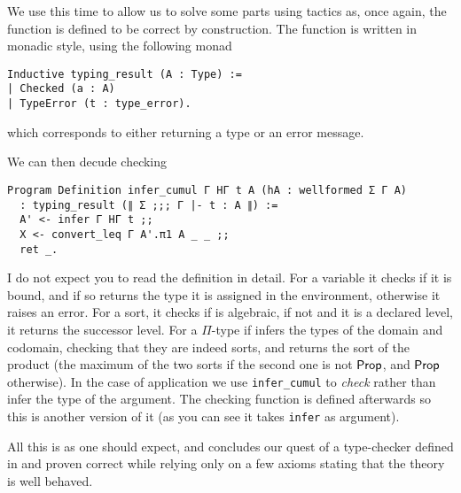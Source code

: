 We use \Program this time to allow us to solve some parts using tactics as,
once again, the function is defined to be correct by construction.
The function is written in monadic style, using the following monad
\begin{verbatim}
Inductive typing_result (A : Type) :=
| Checked (a : A)
| TypeError (t : type_error).
\end{verbatim}
which corresponds to either returning a type or an error message.

We can then decude checking
\begin{verbatim}
Program Definition infer_cumul Γ HΓ t A (hA : wellformed Σ Γ A)
  : typing_result (∥ Σ ;;; Γ |- t : A ∥) :=
  A' <- infer Γ HΓ t ;;
  X <- convert_leq Γ A'.π1 A _ _ ;;
  ret _.
\end{verbatim}

I do not expect you to read the definition in detail. For a variable it checks if
it is bound, and if so returns the type it is assigned in the environment,
otherwise it raises an error.
For a sort, it checks if is algebraic, if not and it is a declared level,
it returns the successor level.
For a \(\Pi\)-type if infers the types of the domain and codomain, checking that
they are indeed sorts, and returns the sort of the product (\ie the maximum
of the two sorts if the second one is not \(\mathsf{Prop}\), and \(\mathsf{Prop}\) otherwise).
In the case of application we use \texttt{infer_cumul} to \emph{check}
rather than infer the type of the argument. The checking function is defined
afterwards so this is another version of it (as you can see it takes
\texttt{infer} as argument).

All this is as one should expect, and concludes our quest of a type-checker
defined in \Coq and proven correct while relying only on a few axioms stating
that the theory is well behaved.